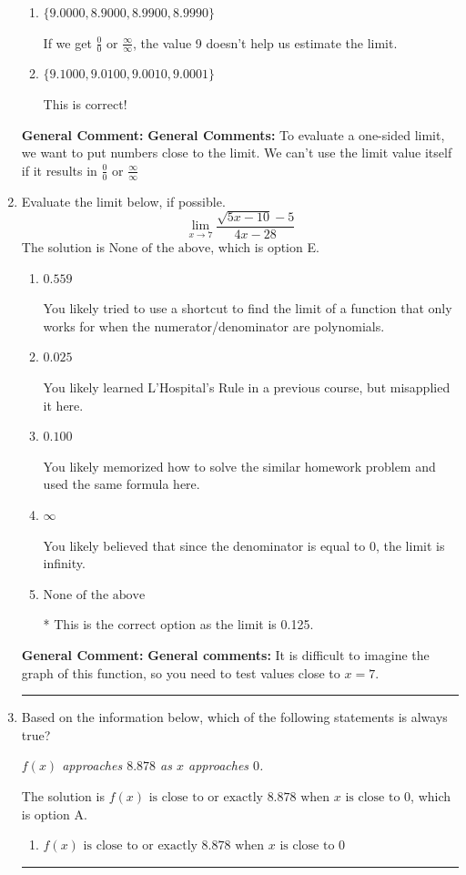 \documentclass{extbook}[14pt]
\newcommand{\litem}[1]{\item #1

\rule{\textwidth}{0.4pt}}
\begin{document}
\begin{enumerate}
{\begin{enumerate}[label=\Alph*.]
If we get $\frac{0}{0}$ or $\frac{\infty}{\infty}$, the value 9 doesn't help us estimate the limit.
\item \( \{ 9.0000, 8.9000, 8.9900, 8.9990 \} \)

If we get $\frac{0}{0}$ or $\frac{\infty}{\infty}$, the value 9 doesn't help us estimate the limit.
\item \( \{ 9.1000, 9.0100, 9.0010, 9.0001 \} \)

This is correct!
\end{enumerate}

\textbf{General Comment:} \textbf{General Comments:} To evaluate a one-sided limit, we want to put numbers close to the limit. We can't use the limit value itself if it results in $\frac{0}{0}$ or $\frac{\infty}{\infty}$
}
\litem{
Evaluate the limit below, if possible.
\[ \lim_{x \rightarrow 7} \frac{\sqrt{5x - 10} - 5}{4x - 28} \]The solution is \( \text{None of the above} \), which is option E.\begin{enumerate}[label=\Alph*.]
\item \( 0.559 \)

You likely tried to use a shortcut to find the limit of a function that only works for when the numerator/denominator are polynomials.
\item \( 0.025 \)

You likely learned L'Hospital's Rule in a previous course, but misapplied it here.
\item \( 0.100 \)

You likely memorized how to solve the similar homework problem and used the same formula here.
\item \( \infty \)

You likely believed that since the denominator is equal to 0, the limit is infinity.
\item \( \text{None of the above} \)

* This is the correct option as the limit is 0.125.
\end{enumerate}

\textbf{General Comment:} \textbf{General comments:} It is difficult to imagine the graph of this function, so you need to test values close to $x = 7$.
}
\litem{
Based on the information below, which of the following statements is always true?

\begin{center}
    \textit{ $f(x)$ approaches $8.878$ as $x$ approaches $0$. }
\end{center}
The solution is \( f(x) \text{ is close to or exactly } 8.878 \text{ when } x \text{ is close to } 0 \), which is option A.\begin{enumerate}[label=\Alph*.]
\item \( f(x) \text{ is close to or exactly } 8.878 \text{ when } x \text{ is close to } 0 \)



\end{enumerate}}
\end{enumerate}
\end{document}
